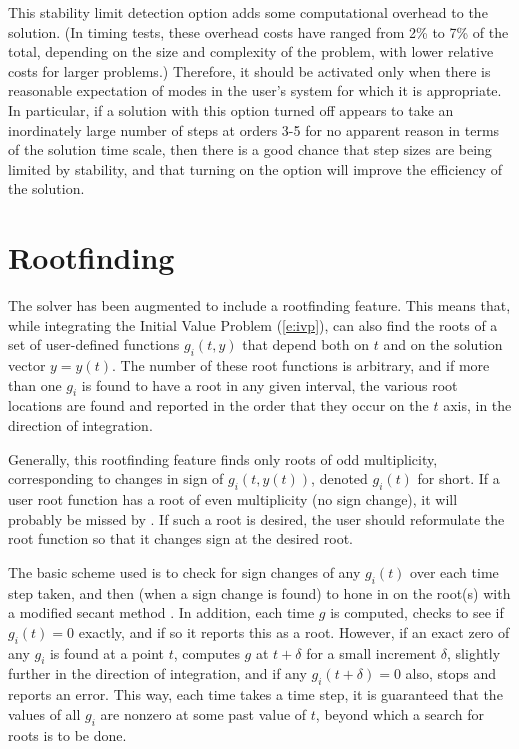 This stability limit detection option adds some computational overhead
to the {\cvodes} solution.  (In timing tests, these overhead costs
have ranged from 2\% to 7\% of the total, depending on the size and
complexity of the problem, with lower relative costs for larger
problems.)  Therefore, it should be activated only when there is
reasonable expectation of modes in the user's system for which it is
appropriate.  In particular, if a {\cvode} solution with this option
turned off appears to take an inordinately large number of steps at
orders 3-5 for no apparent reason in terms of the solution time scale,
then there is a good chance that step sizes are being limited by
stability, and that turning on the option will improve the efficiency
of the solution. 


\section{Rootfinding}\label{ss:rootfinding}

The {\cvodes} solver has been augmented to include a rootfinding
feature.  This means that, while integrating the Initial Value Problem
(\ref{e:ivp}), {\cvodes} can also find the roots of a set of user-defined
functions $g_i(t,y)$ that depend both on $t$ and on the solution vector 
$y = y(t)$.  The number of these root functions is arbitrary, and if
more than one $g_i$ is found to have a root in any given interval, the
various root locations are found and reported in the order that they
occur on the $t$ axis, in the direction of integration.

Generally, this rootfinding feature finds only roots of odd
multiplicity, corresponding to changes in sign of $g_i(t,y(t))$,
denoted $g_i(t)$ for short.  If a user root function has a root of
even multiplicity (no sign change), it will probably be missed by
{\cvodes}.  If such a root is desired, the user should reformulate the
root function so that it changes sign at the desired root.

The basic scheme used is to check for sign changes of any $g_i(t)$ over
each time step taken, and then (when a sign change is found) to hone
in on the root(s) with a modified secant method \cite{HeSh:80}.  
In addition, each time $g$ is computed, {\cvodes} checks to see if 
$g_i(t) = 0$ exactly, and if so it reports this as a root.  However,
if an exact zero of any $g_i$ is found at a point $t$, {\cvodes}
computes $g$ at $t + \delta$ for a small increment $\delta$, slightly
further in the direction of integration, and if any $g_i(t + \delta)=0$ 
also, {\cvodes} stops and reports an error.  This way, each time
{\cvodes} takes a time step, it is guaranteed that the values of all
$g_i$ are nonzero at some past value of $t$, beyond which a search for
roots is to be done.

